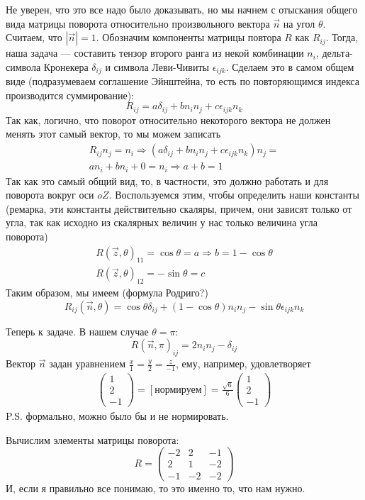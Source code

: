 Не уверен, что это все надо было доказывать, но мы начнем с отыскания общего вида матрицы поворота относительно произвольного вектора $\vec{n}$ на угол $\theta$. Считаем, что $|\vec{n}| = 1$. Обозначим компоненты матрицы повтора $R$ как $R_{ij}$. Тогда, наша задача --- составить тензор второго ранга из некой комбинации $n_i$, дельта-символа Кронекера $\delta_{ij}$ и символа Леви-Чивиты $\epsilon_{ijk}$. Сделаем это в самом общем виде (подразумеваем соглашение Эйнштейна, то есть по повторяющимся индекса производится суммирование):
\begin{equation}
    R_{ij} = a\delta_{ij} + bn_in_j + c\epsilon_{ijk}n_k
\end{equation}
Так как, логично, что поворот относительно некоторого вектора не должен менять этот самый вектор, то мы можем записать
\begin{gather}
    R_{ij}n_j = n_i \Longrightarrow (a\delta_{ij}+bn_in_j + c\epsilon_{ijk}n_k)n_j = \\
    an_i + bn_i + 0 = n_i \Longrightarrow a + b = 1
\end{gather}
Так как это самый общий вид, то, в частности, это должно работать и для поворота вокруг оси $oZ$. Воспользуемся этим, чтобы определить наши константы (ремарка, эти константы действительно скаляры, причем, они зависят только от угла, так как исходно из скалярных величин у нас только величина угла поворота)
\begin{gather}
    R(\vec{z}, \theta)_{11} = \cos\theta = a \Longrightarrow b = 1 - \cos\theta \\
    R(\vec{z}, \theta)_{12} = -\sin\theta = c
\end{gather}
Таким образом, мы имеем (формула Родриго?)
\begin{equation}
    R_{ij}(\vec{n}, \theta) = \cos\theta\delta_{ij} + (1-\cos\theta)n_in_j-\sin\theta\epsilon_{ijk}n_k
\end{equation}

Теперь к задаче. В нашем случае $\theta = \pi$:
\begin{equation}
    R(\vec{n},\pi)_{ij} = 2n_in_j-\delta_{ij}
\end{equation}
Вектор $\vec{n}$ задан уравнением $\frac{x}{1}=\frac{y}{2}=\frac{z}{-1}$, ему, например, удовлетворяет
\begin{gather}
    \begin{pmatrix}
        1\\2\\-1
    \end{pmatrix} = [\text{нормируем}] = 
    \frac{\sqrt{6}}{6}
    \begin{pmatrix}
        1 \\ 2 \\ -1
    \end{pmatrix}
\end{gather}
P.S. формально, можно было бы и не нормировать.

Вычислим элементы матрицы поворота:
\begin{equation}
    R = 
    \begin{pmatrix}
         -2 &  2 & -1 \\
          2 &  1 & -2 \\
         -1 & -2 & -2
    \end{pmatrix}
\end{equation}
И, если я правильно все понимаю, то это именно то, что нам нужно.
